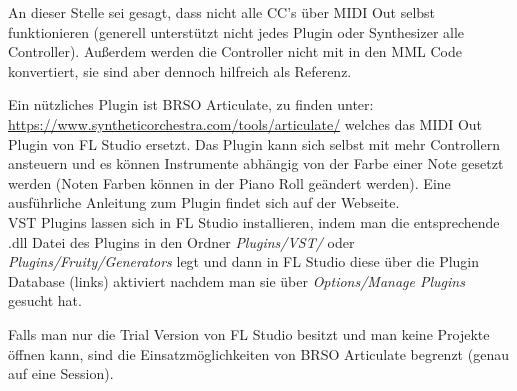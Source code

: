 \bigskip

An dieser Stelle sei gesagt, dass nicht alle CC's über MIDI Out selbst funktionieren (generell unterstützt nicht jedes Plugin oder Synthesizer alle Controller). Außerdem werden die Controller nicht mit in den MML Code konvertiert, sie sind aber dennoch hilfreich als Referenz.

\bigskip

Ein nützliches Plugin ist BRSO Articulate, zu finden unter: \\ \href{https://www.syntheticorchestra.com/tools/articulate/}{https://www.syntheticorchestra.com/tools/articulate/} welches das MIDI Out Plugin von FL Studio ersetzt. Das Plugin kann sich selbst mit mehr Controllern ansteuern und es können Instrumente abhängig von der Farbe einer Note gesetzt werden (Noten Farben können in der Piano Roll geändert werden). Eine ausführliche Anleitung zum Plugin findet sich auf der Webseite. \\
VST Plugins lassen sich in FL Studio installieren, indem man die entsprechende .dll Datei des Plugins in den Ordner \textit{Plugins/VST/} oder \textit{Plugins/Fruity/Generators} legt und dann in FL Studio diese über die Plugin Database (links) aktiviert nachdem man sie über \textit{Options/Manage Plugins} gesucht hat.

\bigskip

Falls man nur die Trial Version von FL Studio besitzt und man keine Projekte öffnen kann, sind die Einsatzmöglichkeiten von BRSO Articulate begrenzt (genau auf eine Session).